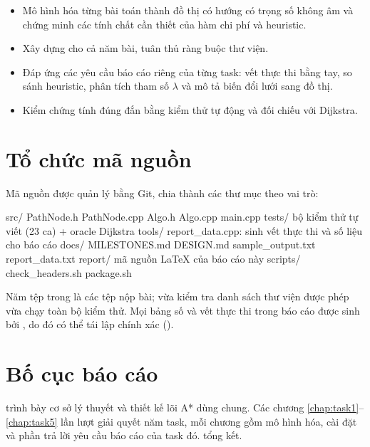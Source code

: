 \begin{itemize}
  \item Mô hình hóa từng bài toán thành đồ thị có hướng có trọng số không âm và chứng minh
        các tính chất cần thiết của hàm chi phí và heuristic.
  \item Xây dựng  cho cả năm bài, tuân thủ ràng buộc thư viện.
  \item Đáp ứng các yêu cầu báo cáo riêng của từng task: vết thực thi bằng tay, so sánh
        heuristic, phân tích tham số $\lambda$ và mô tả biến đổi lưới sang đồ thị.
  \item Kiểm chứng tính đúng đắn bằng kiểm thử tự động và đối chiếu với Dijkstra.
\end{itemize}

\section{Tổ chức mã nguồn}
\label{sec:to-chuc}

Mã nguồn được quản lý bằng Git, chia thành các thư mục theo vai trò:

\begin{khungbash}
src/       PathNode.h  PathNode.cpp  Algo.h  Algo.cpp  main.cpp
tests/     bộ kiểm thử tự viết (23 ca) + oracle Dijkstra
tools/     report_data.cpp: sinh vết thực thi và số liệu cho báo cáo
docs/      MILESTONES.md  DESIGN.md  sample_output.txt  report_data.txt
report/    mã nguồn LaTeX của báo cáo này
scripts/   check_headers.sh  package.sh
\end{khungbash}

Năm tệp trong  là các tệp nộp bài;  vừa kiểm tra danh sách thư viện
được phép vừa chạy toàn bộ kiểm thử. Mọi bảng số và vết thực thi trong báo cáo được sinh bởi
, do đó có thể tái lập chính xác ().

\section{Bố cục báo cáo}
\label{sec:bo-cuc}

 trình bày cơ sở lý thuyết và thiết kế lõi A* dùng chung. Các chương
\ref{chap:task1}--\ref{chap:task5} lần lượt giải quyết năm task, mỗi chương gồm mô hình
hóa, cài đặt và phần trả lời yêu cầu báo cáo của task đó.  tổng kết.
